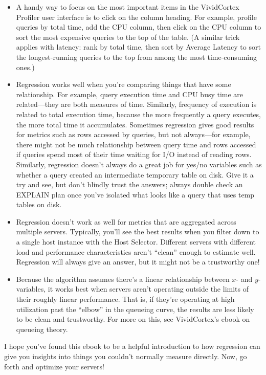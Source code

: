 \documentclass{vivid_layout}
\begin{document}
\begin{itemize}
\item A handy way to focus on the most important items in the VividCortex
	Profiler user interface is to click on the column heading. For example,
	profile queries by total time, add the CPU column, then click on the CPU
	column to sort the most expensive queries to the top of the table. (A similar
	trick applies with latency: rank by total time, then sort by Average Latency
	to sort the longest-running queries to the top from among the most
	time-consuming ones.)
\item Regression works well when you're
	comparing things that have some relationship. For example, query execution
	time and CPU busy time are related---they are both measures of time.
	Similarly, frequency of execution is related to total execution time, because
	the more frequently a query executes, the more total time it accumulates.
	Sometimes regression gives good results for metrics such as rows accessed by
	queries, but not always---for example, there might not be much relationship
	between query time and rows accessed if queries spend most of their time
	waiting for I/O instead of reading rows. Similarly, regression doesn't always do a
	great job for yes/no variables such as whether a query created an
	intermediate temporary table on disk. Give it a try and see, but don't
	blindly trust the answers; always double check an EXPLAIN plan once you've
	isolated what looks like a query that uses temp tables on disk.
\item Regression doesn't work as well for metrics that are aggregated across
	multiple servers. Typically, you'll see the best results when you filter down
	to a single host instance with the Host Selector. Different servers with
	different load and performance characteristics aren't ``clean'' enough to
	estimate well. Regression will always give an answer, but it might not be a
	trustworthy one!
\item Because the algorithm assumes there's a linear relationship between $x$-
	and $y$-variables, it works best when servers aren't operating outside the
	limits of their roughly linear performance. That is, if they're operating at
	high utilization past the ``elbow'' in the queueing curve, the results are
	less likely to be clean and trustworthy. For more on this, see VividCortex's
	ebook on queueing theory.
\end{itemize}

I hope you've found this ebook to be a helpful introduction to how regression
can give you insights into things you couldn't normally measure directly. Now,
go forth and optimize your servers!
\end{document}
